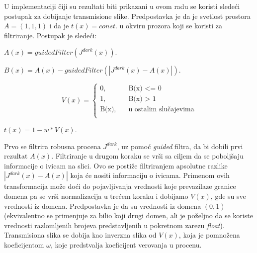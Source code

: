 \documentclass[a4paper,12pt,titlepage]{article}
\begin{document}
U implementaciji čiji su rezultati biti prikazani u ovom radu se koristi sledeći postupak za dobijanje transmisione slike. Predpostavka je da je svetlost prostora $A = (1, 1, 1)$ i da je $t(x) = const.$ u okviru prozora koji se koristi za filtriranje. Postupak je sledeći:

\begin{center}
$A(x) = guidedFilter(J^{dark}(x))$.
\end{center}

\begin{center}
$B(x) = A(x) - guidedFilter(|J^{dark}(x) - A(x)|)$.
\end{center}

\[   
V(x) = 
     \begin{cases}
       \text{0,} &\quad\text{B(x) <= 0}\\
       \text{1,} &\quad\text{B(x) > 1} \\
       \text{B(x),} &\quad\text{u ostalim slučajevima}\\
     \end{cases}
\]

\begin{center}
$t(x) = 1 - w * V(x)$.
\end{center}

Prvo se filtrira robusna procena $J^{dark}$, uz pomoć \emph{guided} filtra, da bi dobili prvi rezultat $A(x)$. Filtriranje u drugom koraku se vrši sa ciljem da se poboljšaju informacije o ivicam na slici. Ovo se postiže filtriranjem apsolutne razlike $|J^{dark}(x) - A(x)|$ koja će nositi informaciju o ivicama. Primenom ovih transformacija može doći do pojavljivanja vrednosti koje prevazilaze granice domena pa se vrši normalizacija u trećem koraku i dobijamo $V(x)$, gde su sve vrednosti iz domena. Predpostavka je da su vrednosti iz domena $(0, 1)$ (ekvivalentno se primenjuje za bilio koji drugi domen, ali je poželjno da se koriste vrednosti razlomljenih brojeva predstavljenih u pokretnom zarezu \emph{float}). Transmisiona slika se dobija kao inverzna slika od $V(x)$, koja je pomnožena koeficijentom $\omega$, koje predstvalja koeficijent verovanja u procenu.
\end{document}
